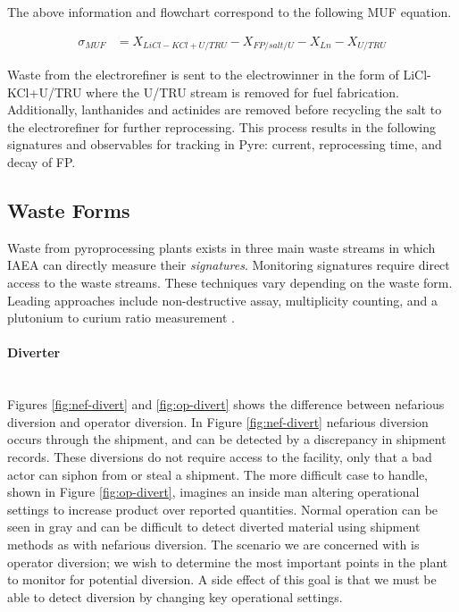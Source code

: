 The above information and flowchart correspond to the following MUF equation.

\begin{align}
\sigma_{MUF} &= X_{LiCl-KCl + U/TRU} - X_{FP/salt/U} - X_{Ln} - X_{U/TRU}
\end{align}

Waste from the electrorefiner is sent to the electrowinner in the form of LiCl-KCl+U/TRU where the U/TRU stream is removed for fuel fabrication. Additionally, lanthanides and actinides are removed before recycling the salt to the electrorefiner for further reprocessing. This process results in the following signatures and observables for tracking in Pyre: current, reprocessing time, and decay of FP. 

\subsection{Waste Forms}

Waste from pyroprocessing plants exists in three main waste streams in which IAEA can directly measure their \emph{signatures}. Monitoring signatures require direct access to the waste streams.
These techniques vary depending on the waste form. Leading approaches include non-destructive assay, multiplicity counting, and a plutonium to curium ratio measurement \cite{lee_determination_2012,noauthor_non-destructive_nodate}.

\paragraph{Diverter} \mbox{}\\
Figures \ref{fig:nef-divert} and \ref{fig:op-divert} shows the difference between nefarious diversion and operator diversion. In Figure \ref{fig:nef-divert} nefarious diversion occurs
through the shipment, and can be detected by a discrepancy in shipment records. These diversions do not require access to the facility, only that a bad actor can siphon from or steal a shipment. The more difficult case to handle, shown in Figure \ref{fig:op-divert}, imagines an inside man altering operational settings
to increase product over reported quantities. Normal operation can be seen in gray and can be difficult to detect diverted material using shipment methods as with nefarious diversion. The scenario we are concerned with is operator diversion; we wish to determine the most important points in the plant to monitor for potential
diversion. A side effect of this goal is that we must be able to detect diversion by changing key operational settings.

